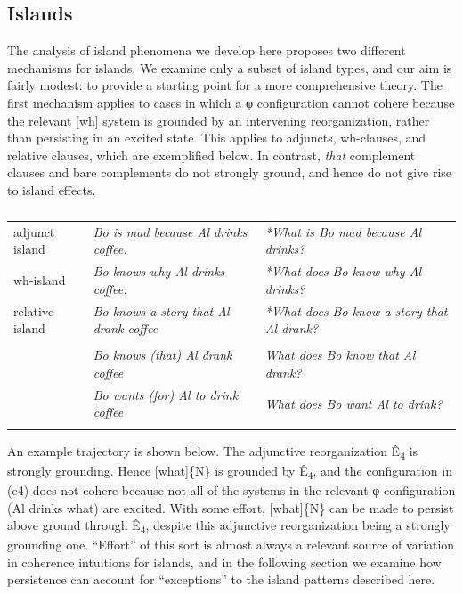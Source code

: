 \subsection{Islands}

The analysis of island phenomena we develop here proposes two different mechanisms for islands. We examine only a subset of island types, and our aim is fairly modest: to provide a starting point for a more comprehensive theory. The first mechanism applies to cases in which a φ configuration cannot cohere because the relevant [wh] system is grounded by an intervening reorganization, rather than persisting in an excited state. This applies to adjuncts, wh-clauses, and relative clauses, which are exemplified below. In contrast, \textit{that} complement clauses and bare complements do not strongly ground, and hence do not give rise to island effects.

\begin{table}
\begin{tabularx}{\textwidth}{lQQ}
\lsptoprule
{}\\
\midrule
adjunct island & \textit{Bo is mad because Al drinks coffee.} & \textit{*What is Bo mad because Al drinks?}\\
wh-island & \textit{Bo knows why Al drinks coffee.} & \textit{*What does Bo know why Al drinks?}\\
relative island & \textit{Bo knows a story that Al drank coffee} & \textit{*What does Bo know a story that Al drank?}\\
\tablevspace
{}\\
\midrule 
& \textit{Bo knows (that) Al drank coffee} & \textit{What does Bo know that Al drank?}\\
& \textit{Bo wants (for) Al to drink coffee} & \textit{What does Bo want Al to drink?}\\
\lspbottomrule
\end{tabularx}
\caption{\missingcaption}\label{tab:key:}
\end{table}

  An example trajectory is shown below. The adjunctive reorganization Ê\textsubscript{4} is strongly grounding. Hence [what]\{N\} is grounded by Ê\textsubscript{4}, and the configuration in (e4) does not cohere because not all of the systems in the relevant φ configuration ({\textbar}Al drinks what{\textbar}) are excited. With some effort, [what]\{N\} can be made to persist above ground through Ê\textsubscript{4}, despite this adjunctive reorganization being a strongly grounding one. “Effort” of this sort is almost always a relevant source of variation in coherence intuitions for islands, and in the following section we examine how persistence can account for “exceptions” to the island patterns described here.

